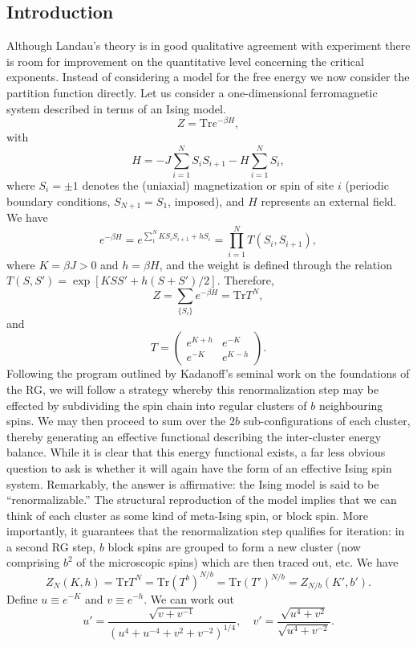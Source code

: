 \subsection{Introduction}
Although Landau's theory is in good qualitative agreement with experiment there is room for improvement on the quantitative level concerning the critical exponents.
Instead of considering a model for the free energy we now consider the partition function directly.
Let us consider a one-dimensional ferromagnetic system described in terms of an Ising model.
\[Z = \mathrm{Tr}e^{-\beta H},\]
with
\[H = -J\sum_{i=1}^N S_i S_{i+1} - H\sum_{i=1}^N S_i,\]
where $S_i = \pm 1$ denotes the (uniaxial) magnetization or spin of site $i$ (periodic boundary conditions, $S_{N+1} = S_1$, imposed), and $H$ represents an external field. We have
\[e^{-\beta H} = e^{\sum_{1}^N KS_iS_{i+1} + hS_i} = \prod_{i=1}^N T(S_i,S_{i+1}),\]
where $K = \beta J > 0$ and $h = \beta H$, and the weight is defined through the relation $T(S,S') = \exp[KSS' + h(S+S')/2]$. Therefore,
\[Z = \sum_{\{S_i\}} e^{-\beta H} = \mathrm{Tr}T^N,\]
and
\[T = \begin{pmatrix}
e^{K+h} & e^{-K} \\ e^{-K} & e^{K-h}
\end{pmatrix}.\]
Following the program outlined by Kadanoff's seminal work on the foundations of the RG, we will follow a strategy whereby this renormalization step may be effected by subdividing the spin chain into regular clusters of $b$ neighbouring spins. We may then proceed to sum over the $2b$ sub-configurations of each cluster, thereby generating an effective functional describing the inter-cluster energy balance. 
While it is clear that this energy functional exists, a far less obvious question to ask is whether it will again have the form of an effective Ising spin system. Remarkably, the answer is affirmative: the Ising model is said to be ``renormalizable.'' 
The structural reproduction of the model implies that we can think of each cluster as some kind of meta-Ising spin, or block spin. More importantly, it guarantees that the renormalization step qualifies for iteration: in a second RG step, $b$ block spins are grouped to form a new cluster (now comprising $b^2$ of the microscopic spins) which are then traced out, etc. We have
\[Z_{N}(K,h) = \mathrm{Tr} T^N = \mathrm{Tr} (T^b)^{N/b} =\mathrm{Tr} (T')^{N/b} = Z_{N/b}(K',b').\]
Define $u \equiv e^{-K}$ and $v \equiv e^{-h}$. We can work out
\[u' = \frac{\sqrt{v+v^{-1}}}{(u^4 + u^{-4} + v^2 + v^{-2})^{1/4}} , \quad v' = \frac{\sqrt{u^4 + v^2}}{\sqrt{u^4 + v^{-2}}}.\]
